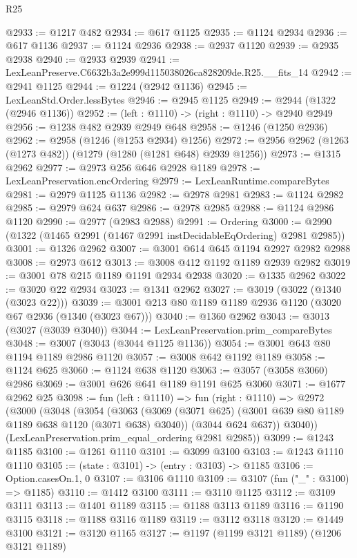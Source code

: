 \begin{lexlean}{R25}
\begin{coremodule}
@2933 := @1217 @482
@2934 := @617 @1125
@2935 := @1124 @2934
@2936 := @617 @1136
@2937 := @1124 @2936
@2938 := @2937 @1120
@2939 := @2935 @2938
@2940 := @2933 @2939
@2941 := LexLeanPreserve.C6632b3a2e999d115038026ca828209de.R25.__fits_14
@2942 := @2941 @1125
@2944 := @1224 (@2942 @1136)
@2945 := LexLeanStd.Order.lessBytes
@2946 := @2945 @1125
@2949 := @2944 (@1322 (@2946 @1136))
@2952 := (left : @1110) -> (right : @1110) -> @2940 @2949
@2956 := @1238 @482 @2939 @2949 @648
@2958 := @1246 (@1250 @2936)
@2962 := @2958 (@1246 (@1253 @2934) @1256)
@2972 := @2956 @2962 (@1263 (@1273 @482)) (@1279 (@1280 (@1281 @648) @2939 @1256))
@2973 := @1315 @2962
@2977 := @2973 @256 @646 @2928 @1189
@2978 := LexLeanPreservation.encOrdering
@2979 := LexLeanRuntime.compareBytes
@2981 := @2979 @1125 @1136
@2982 := @2978 @2981
@2983 := @1124 @2982
@2985 := @2979 @624 @637
@2986 := @2978 @2985
@2988 := @1124 @2986 @1120
@2990 := @2977 (@2983 @2988)
@2991 := Ordering
@3000 := @2990 (@1322 (@1465 @2991 (@1467 @2991 instDecidableEqOrdering) @2981 @2985))
@3001 := @1326 @2962
@3007 := @3001 @614 @645 @1194 @2927 @2982 @2988
@3008 := @2973 @612
@3013 := @3008 @412 @1192 @1189 @2939 @2982
@3019 := @3001 @78 @215 @1189 @1191 @2934 @2938
@3020 := @1335 @2962
@3022 := @3020 @22 @2934
@3023 := @1341 @2962
@3027 := @3019 (@3022 (@1340 (@3023 @22)))
@3039 := @3001 @213 @80 @1189 @1189 @2936 @1120 (@3020 @67 @2936 (@1340 (@3023 @67)))
@3040 := @1360 @2962
@3043 := @3013 (@3027 (@3039 @3040))
@3044 := LexLeanPreservation.prim_compareBytes
@3048 := @3007 (@3043 (@3044 @1125 @1136))
@3054 := @3001 @643 @80 @1194 @1189 @2986 @1120
@3057 := @3008 @642 @1192 @1189
@3058 := @1124 @625
@3060 := @1124 @638 @1120
@3063 := @3057 (@3058 @3060) @2986
@3069 := @3001 @626 @641 @1189 @1191 @625 @3060
@3071 := @1677 @2962 @25
@3098 := fun (left : @1110) =>
  fun (right : @1110) =>
  @2972
    (@3000
      (@3048
        (@3054
          (@3063
            (@3069 (@3071 @625) (@3001 @639 @80 @1189 @1189 @638 @1120 (@3071 @638) @3040))
            (@3044 @624 @637))
          @3040))
      (LexLeanPreservation.prim_equal_ordering @2981 @2985))
@3099 := @1243 @1185
@3100 := @1261 @1110
@3101 := @3099 @3100
@3103 := @1243 @1110 @1110
@3105 := (state : @3101) -> (entry : @3103) -> @1185
@3106 := Option.casesOn.{1, 0}
@3107 := @3106 @1110
@3109 := @3107 (fun ("_" : @3100) => @1185)
@3110 := @1412 @3100
@3111 := @3110 @1125
@3112 := @3109 @3111
@3113 := @1401 @1189
@3115 := @1188 @3113 @1189
@3116 := @1190 @3115
@3118 := @1188 @3116 @1189
@3119 := @3112 @3118
@3120 := @1449 @3100
@3121 := @3120 @1165
@3127 := @1197 (@1199 @3121 @1189) (@1206 @3121 @1189)

\end{coremodule}
\end{lexlean}

